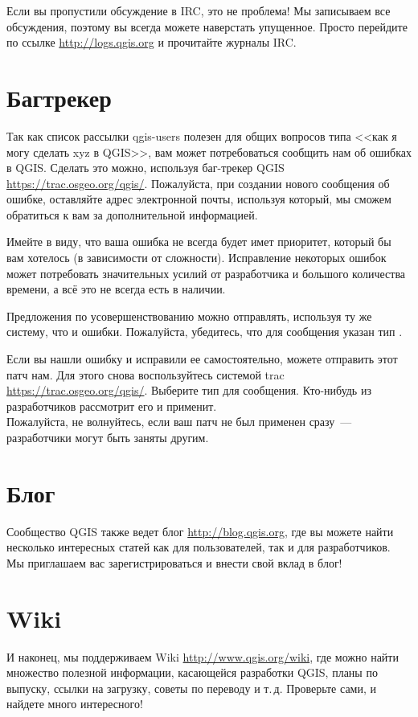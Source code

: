 Если вы пропустили обсуждение в IRC, это не проблема! Мы записываем все
обсуждения, поэтому вы всегда можете наверстать упущенное. Просто
перейдите по ссылке \url{http://logs.qgis.org} и прочитайте журналы IRC.

\section{Багтрекер}
Так как список рассылки qgis-users полезен для общих вопросов типа <<как я
могу сделать xyz в QGIS>>, вам может потребоваться сообщить нам об
ошибках в QGIS. Сделать это можно, используя баг-трекер QGIS
\url{https://trac.osgeo.org/qgis/}. Пожалуйста, при создании нового
сообщения об ошибке, оставляйте адрес электронной почты, используя
который, мы сможем обратиться к вам за дополнительной информацией.

Имейте в виду, что ваша ошибка не всегда будет имет приоритет, который
бы вам хотелось (в зависимости от сложности). Исправление некоторых
ошибок может потребовать значительных усилий от разработчика и большого
количества времени, а всё это не всегда есть в наличии.

Предложения по усовершенствованию можно отправлять, используя ту же
систему, что и ошибки. Пожалуйста, убедитесь, что для сообщения указан
тип .

Если вы нашли ошибку и исправили ее самостоятельно, можете отправить
этот патч нам. Для этого снова воспользуйтесь системой trac
\url{https://trac.osgeo.org/qgis/}. Выберите тип  для
сообщения. Кто-нибудь из разработчиков рассмотрит его и применит. \\
Пожалуйста, не волнуйтесь, если ваш патч не был применен сразу~---
разработчики могут быть заняты другим.


\section{Блог}
Сообщество QGIS также ведет блог \url{http://blog.qgis.org},
где вы можете найти несколько интересных статей как для пользователей,
так и для разработчиков. Мы приглашаем вас зарегистрироваться и внести
свой вклад в блог!

\section{Wiki}
И наконец, мы поддерживаем Wiki \url{http://www.qgis.org/wiki}, где
можно найти множество полезной информации, касающейся разработки QGIS,
планы по выпуску, ссылки на загрузку, советы по переводу и т.\,д.
Проверьте сами, и найдете много интересного!
